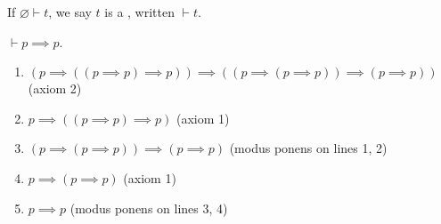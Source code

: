 \begin{definition}
    If $\varnothing \vdash t$, we say $t$ is a , written $\vdash t$.
\end{definition}
\begin{example}
    $\vdash p \implies p$.
    \begin{enumerate}
        \item $(p \implies ((p \implies p) \implies p)) \implies ((p \implies (p \implies p)) \implies (p \implies p))$ (axiom 2)
        \item $p \implies ((p \implies p) \implies p)$ (axiom 1)
        \item $(p \implies (p \implies p)) \implies (p \implies p)$ (modus ponens on lines 1, 2)
        \item $p \implies (p \implies p)$ (axiom 1)
        \item $p \implies p$ (modus ponens on lines 3, 4)
    \end{enumerate}
\end{example}

